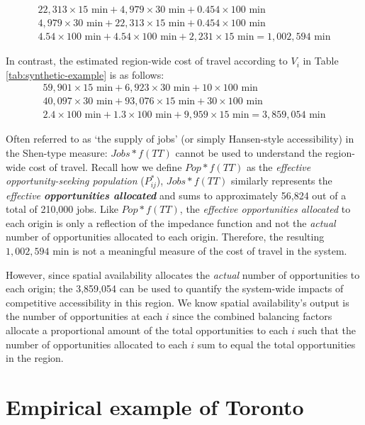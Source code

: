 \documentclass[10pt,letterpaper]{article}
\begin{document}
\[
\begin{array}{l}
22,313\times 15 \text{ min} + 4,979\times 30 \text{ min} + 0.454\times 100 \text{ min}\\
4,979\times 30 \text{ min} + 22,313\times 15 \text{ min} + 0.454\times 100 \text{ min}\\
4.54\times 100 \text{ min} + 4.54\times 100 \text{ min} + 2,231\times 15 \text{ min} = 1,002,594\text{ min}
\end{array}
\]

In contrast, the estimated region-wide cost of travel according to
\(V_i\) in Table \ref{tab:synthetic-example} is as follows: \[
\begin{array}{l}
59,901\times 15 \text{ min} + 6,923\times 30 \text{ min} + 10\times 100 \text{ min}\\
40,097\times 30 \text{ min} + 93,076\times 15 \text{ min} + 30\times 100 \text{ min}\\
2.4\times 100 \text{ min} + 1.3\times 100 \text{ min} + 9,959\times 15 \text{ min} = 3,859,054\text{ min}
\end{array}
\]

Often referred to as `the supply of jobs' (or simply Hansen-style
accessibility) in the Shen-type measure: \(Jobs*f(TT)\) cannot be used
to understand the region-wide cost of travel. Recall how we define
\(Pop*f(TT)\) as the \emph{effective opportunity-seeking population}
(\(P^*_{ij}\)), \(Jobs*f(TT)\) similarly represents the \emph{effective
\textbf{opportunities allocated}} and sums to approximately 56,824 out
of a total of 210,000 jobs. Like \(Pop*f(TT)\), the \emph{effective
opportunities allocated} to each origin is only a reflection of the
impedance function and not the \emph{actual} number of opportunities
allocated to each origin. Therefore, the resulting
\(1,002,594\text{ min}\) is not a meaningful measure of the cost of
travel in the system.

However, since spatial availability allocates the \emph{actual} number
of opportunities to each origin; the 3,859,054 can be used to
quantify the system-wide impacts of competitive accessibility in this
region. We know spatial availability's output is the number of
opportunities at each \(i\) since the combined balancing factors
allocate a proportional amount of the total opportunities to each \(i\)
such that the number of opportunities allocated to each \(i\) sum to
equal the total opportunities in the region.

\hypertarget{empirical-example-of-toronto}{%
\section{Empirical example of
Toronto}\label{empirical-example-of-toronto}}
\end{document}
